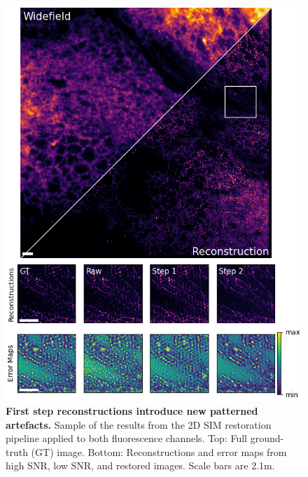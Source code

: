 \documentclass[12pt]{article}
\begin{document}
\begin{figure}[hbtp]
    \includegraphics[scale=1.05, center]{figures/mt_0_016_error.png}
    \caption{\textbf{First step reconstructions introduce new patterned artefacts.}
    Sample of the results from the 2D SIM restoration pipeline applied to both fluorescence channels.
    Top: Full ground-truth (GT) image. Bottom: Reconstructions and error maps from high SNR, low SNR, and restored images.
    Scale bars are 2.1\textmu m.}
    \label{fig:er_samples}
\end{figure}
\end{document}
